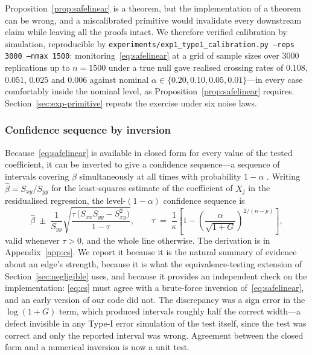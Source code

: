\begin{remark}\label{rem:calibration}
Proposition~\ref{prop:safelinear} is a theorem, but the implementation of a
theorem can be wrong, and a miscalibrated primitive would invalidate every
downstream claim while leaving all the proofs intact. We therefore verified
calibration by simulation, reproducible by
\texttt{experiments/exp1\_type1\_calibration.py --reps 3000 --nmax 1500}:
monitoring~\eqref{eq:safelinear} at a grid of sample sizes over $3000$
replications up to $n = 1500$ under a true null gave realised crossing rates
of $0.108$, $0.051$, $0.025$ and $0.006$ against nominal
$\alpha \in \{0.20, 0.10, 0.05, 0.01\}$---in every case comfortably inside the
nominal level, as Proposition~\ref{prop:safelinear} requires.
Section~\ref{sec:exp-primitive} repeats the exercise under six noise laws.
\end{remark}

\subsubsection{Confidence sequence by inversion}\label{sec:cs}

Because~\eqref{eq:safelinear} is available in closed form for every value of
the tested coefficient, it can be inverted to give a confidence sequence---a
sequence of intervals covering $\beta$ simultaneously at all times with
probability $1-\alpha$ \citep{howard2021timeuniform}. Writing $\hat\beta = S_{xy}/S_{yy}$ for the
least-squares estimate of the coefficient of $X_j$ in the residualised
regression, the level-$(1-\alpha)$ confidence sequence is
\begin{equation}\label{eq:cs}
\hat\beta \;\pm\; \frac{1}{S_{yy}}
  \sqrt{\frac{\tau\,\bigl(S_{xx} S_{yy} - S_{xy}^2\bigr)}{1-\tau}},
\qquad
\tau \;=\; \frac{1}{\kappa}
  \left[ 1 - \left(\frac{\alpha}{\sqrt{1+G}}\right)^{2/(n-p)} \right] ,
\end{equation}
valid whenever $\tau > 0$, and the whole line otherwise. The derivation is in
Appendix~\ref{app:cs}. We report it because it is the natural summary of
evidence about an edge's strength, because it is what the equivalence-testing
extension of Section~\ref{sec:negligible} uses, and because it provides an
independent check on the implementation: \eqref{eq:cs} must agree with a
brute-force inversion of~\eqref{eq:safelinear}, and an early version of our
code did not. The discrepancy was a sign error in the $\log(1+G)$ term, which
produced intervals roughly half the correct width---a defect invisible in any
Type-I error simulation of the test itself, since the test was correct and
only the reported interval was wrong. Agreement between the closed form and a
numerical inversion is now a unit test.

